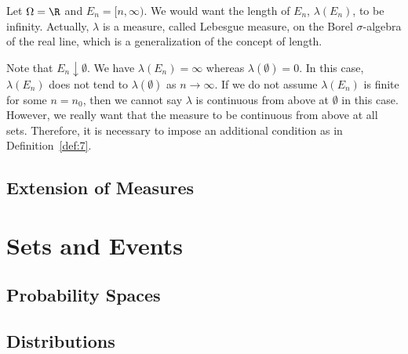 \documentclass[thmcnt=section, 12pt, color=purple]{my-elegantbook}
\begin{document}
\begin{example} \label{eg:3}
	Let $\Omega = \R$ and $E_n = [n, \infty)$.
	We would want the length of $E_n$, $\lambda(E_n)$,
	to be infinity.
	Actually, $\lambda$ is a measure, called Lebesgue measure, 
	on the Borel $\sigma$-algebra of the real line,
	which is a generalization of the concept of length.

	Note that $E_n \downarrow \emptyset$.
	We have $\lambda(E_n) = \infty$ whereas $\lambda(\emptyset) = 0$.
	In this case, $\lambda(E_n)$ does not tend to $\lambda(\emptyset)$
	as $n \to \infty$.
	If we do not assume $\lambda(E_n)$ is finite for some $n = n_0$,
	then we cannot say $\lambda$ is continuous from above at $\emptyset$
	in this case.
	However, we really want that the measure to be continuous from above
	at all sets.
	Therefore, it is necessary to impose an additional condition
	as in Definition~\ref{def:7}.
\end{example}


\section{Extension of Measures}


\begin{theorem} \label{thm:1}
\end{theorem}


\chapter{Sets and Events}


\section{Probability Spaces}




\section{Distributions}




\printbibliography[heading=bibintoc, title=References]


\printindex

\end{document}
